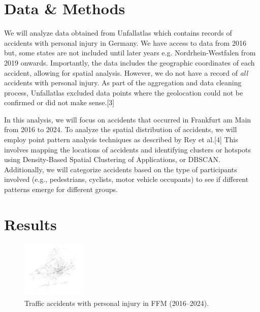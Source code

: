 \documentclass[10pt,a4paper]{article} %
\begin{document}
\section*{Data \& Methods}
We will analyze data obtained from Unfallatlas which contains records of accidents with personal injury in Germany. We have access to data from 2016 but, some states are not included until later years e.g. Nordrhein-Westfalen from 2019 onwards. Importantly, the data includes the geographic coordinates of each accident, allowing for spatial analysis. However, we do not have a record of \textit{all} accidents with personal injury. As part of the aggregation and data cleaning process, Unfallatlas excluded data points where the geolocation could not be confirmed or did not make sense.[3]
\medskip\par
In this analysis, we will focus on accidents that occurred in Frankfurt am Main from 2016 to 2024. To analyze the spatial distribution of accidents, we will employ point pattern analysis techniques as described by Rey et al.[4] This involves mapping the locations of accidents and identifying clusters or hotspots using Density-Based Spatial Clustering of Applications, or DBSCAN\@. Additionally, we will categorize accidents based on the type of participants involved (e.g., pedestrians, cyclists, motor vehicle occupants) to see if different patterns emerge for different groups.

\section*{Results}
\begin{figure}
    \centering
    \vspace{-20pt}
    \includegraphics[width=0.28\textwidth]{../src/img/ffm-2016-2024-bw.png} %
    \caption{Traffic accidents with personal injury in FFM (2016--2024).}
    \vspace{-10pt}
\end{figure}
\end{document}
